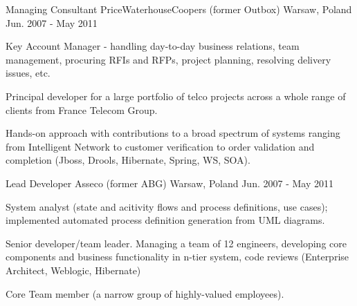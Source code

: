 \begin{cventries}
  \cventry
    {Managing Consultant} %
    {PriceWaterhouseCoopers (former Outbox)} %
    {Warsaw, Poland} %
    {Jun. 2007 - May 2011} %
    {
      \begin{cvitems} %
        \item {Key Account Manager - handling day-to-day business relations, team management, procuring RFIs and RFPs, project planning, resolving delivery issues, etc.}
        \item {Principal developer for a large portfolio of telco projects across a whole range of clients from France Telecom Group.}
        \item {Hands-on approach with contributions to a broad spectrum of systems ranging from Intelligent Network to customer verification to order validation and completion (Jboss, Drools, Hibernate, Spring, WS, SOA).}
      \end{cvitems}
    }

  \cventry
    {Lead Developer} %
    {Asseco (former ABG)} %
    {Warsaw, Poland} %
    {Jun. 2007 - May 2011} %
    {
      \begin{cvitems} %
        \item {System analyst (state and acitivity flows and process definitions, use cases); implemented automated process definition generation from UML diagrams.}
        \item {Senior developer/team leader. Managing a team of 12 engineers, developing core components and business functionality in n-tier system, code reviews (Enterprise Architect, Weblogic, Hibernate)}
        \item {Core Team member (a narrow group of highly-valued employees).}
      \end{cvitems}
    }

\end{cventries}
